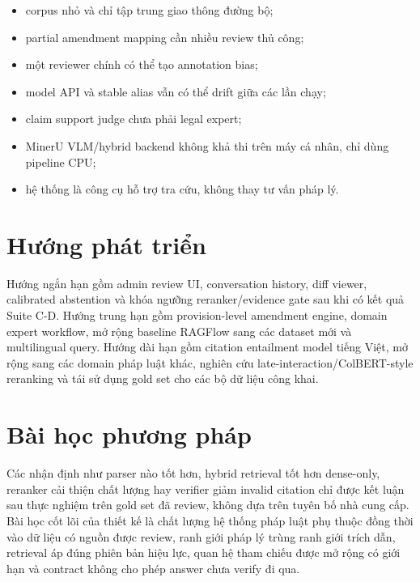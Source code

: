 \documentclass[a4paper,12pt]{extreport}
\begin{document}
\begin{itemize}
  \item corpus nhỏ và chỉ tập trung giao thông đường bộ;
  \item partial amendment mapping cần nhiều review thủ công;
  \item một reviewer chính có thể tạo annotation bias;
  \item model API và stable alias vẫn có thể drift giữa các lần chạy;
  \item claim support judge chưa phải legal expert;
  \item MinerU VLM/hybrid backend không khả thi trên máy cá nhân, chỉ dùng pipeline CPU;
  \item hệ thống là công cụ hỗ trợ tra cứu, không thay tư vấn pháp lý.
\end{itemize}

\section{Hướng phát triển}

Hướng ngắn hạn gồm admin review UI, conversation history, diff viewer, calibrated abstention và khóa ngưỡng reranker/evidence gate sau khi có kết quả Suite C-D. Hướng trung hạn gồm provision-level amendment engine, domain expert workflow, mở rộng baseline RAGFlow sang các dataset mới và multilingual query. Hướng dài hạn gồm citation entailment model tiếng Việt, mở rộng sang các domain pháp luật khác, nghiên cứu late-interaction/ColBERT-style reranking và tái sử dụng gold set cho các bộ dữ liệu công khai.

\section{Bài học phương pháp}

Các nhận định như parser nào tốt hơn, hybrid retrieval tốt hơn dense-only, reranker cải thiện chất lượng hay verifier giảm invalid citation chỉ được kết luận sau thực nghiệm trên gold set đã review, không dựa trên tuyên bố nhà cung cấp. Bài học cốt lõi của thiết kế là chất lượng hệ thống pháp luật phụ thuộc đồng thời vào dữ liệu có nguồn được review, ranh giới pháp lý trùng ranh giới trích dẫn, retrieval áp đúng phiên bản hiệu lực, quan hệ tham chiếu được mở rộng có giới hạn và contract không cho phép answer chưa verify đi qua.

\clearpage
\printbibliography[heading=bibintoc,title={Tài Liệu Tham Khảo}]
\end{document}
